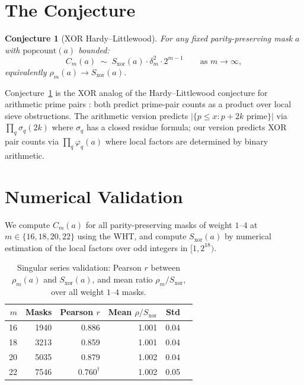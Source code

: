 \documentclass[11pt]{article}
\newtheorem{conjecture}[theorem]{Conjecture}
\begin{document}
\section{The Conjecture}

\begin{conjecture}[XOR Hardy--Littlewood]
\label{conj:main}
For any fixed parity-preserving mask $a$ with $\mathrm{popcount}(a)$ bounded:
\[
  C_m(a)
  \;\sim\;
  S_{\mathrm{xor}}(a) \cdot \delta_m^2 \cdot 2^{m-1}
  \qquad \text{as } m \to \infty,
\]
equivalently $\rho_m(a) \to S_{\mathrm{xor}}(a)$.
\end{conjecture}

Conjecture~\ref{conj:main} is the XOR analog of the Hardy--Littlewood
conjecture for arithmetic prime pairs \cite{hardylittlewood1923}:
both predict prime-pair counts as a product over local sieve obstructions.
The arithmetic version predicts $|\{p \leq x : p + 2k \text{ prime}\}|$
via $\prod_q \sigma_q(2k)$ where $\sigma_q$ has a closed residue formula;
our version predicts XOR pair counts via $\prod_q \varphi_q(a)$
where local factors are determined by binary arithmetic.

\section{Numerical Validation}

We compute $C_m(a)$ for all parity-preserving masks of weight $1$--$4$
at $m \in \{16, 18, 20, 22\}$ using the WHT, and compute $S_{\mathrm{xor}}(a)$
by numerical estimation of the local factors over odd integers in $[1, 2^{18})$.

\begin{table}[h]
\centering
\caption{Singular series validation: Pearson $r$ between $\rho_m(a)$ and
$S_{\mathrm{xor}}(a)$, and mean ratio $\rho_m/S_{\mathrm{xor}}$,
over all weight $1$--$4$ masks.}
\label{tab:validation}
\begin{tabular}{rrrrrr}
\toprule
$m$ & Masks & Pearson $r$ & Mean $\rho/S_{\mathrm{xor}}$ & Std \\
\midrule
16 & 1940 & 0.886 & 1.001 & 0.04 \\
18 & 3213 & 0.859 & 1.001 & 0.04 \\
20 & 5035 & 0.879 & 1.002 & 0.04 \\
22 & 7546 & $0.760^\dagger$ & 1.002 & 0.05 \\
\bottomrule
\end{tabular}
\end{table}
\end{document}
